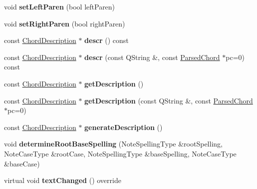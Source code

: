\begin{DoxyCompactItemize}
void {\bfseries set\+Left\+Paren} (bool left\+Paren)
\item 
\mbox{\label{class_ms_1_1_harmony_af1aa4c009b87d06fde12a7e87005ee74}} 
void {\bfseries set\+Right\+Paren} (bool right\+Paren)
\item 
\mbox{\label{class_ms_1_1_harmony_a32884bec863d0d850238f8090c31d319}} 
const \hyperlink{struct_ms_1_1_chord_description}{Chord\+Description} $\ast$ {\bfseries descr} () const
\item 
\mbox{\label{class_ms_1_1_harmony_a33f47123a38937ec90bcc843646b9ff4}} 
const \hyperlink{struct_ms_1_1_chord_description}{Chord\+Description} $\ast$ {\bfseries descr} (const Q\+String \&, const \hyperlink{class_ms_1_1_parsed_chord}{Parsed\+Chord} $\ast$pc=0) const
\item 
\mbox{\label{class_ms_1_1_harmony_a62c58cbb564560f73770416cb9592d55}} 
const \hyperlink{struct_ms_1_1_chord_description}{Chord\+Description} $\ast$ {\bfseries get\+Description} ()
\item 
\mbox{\label{class_ms_1_1_harmony_a3b107c6f71691adaae6b5b266526e168}} 
const \hyperlink{struct_ms_1_1_chord_description}{Chord\+Description} $\ast$ {\bfseries get\+Description} (const Q\+String \&, const \hyperlink{class_ms_1_1_parsed_chord}{Parsed\+Chord} $\ast$pc=0)
\item 
\mbox{\label{class_ms_1_1_harmony_a2bdb2f2d2a5bb5cfc4d8d3d76aed43c0}} 
const \hyperlink{struct_ms_1_1_chord_description}{Chord\+Description} $\ast$ {\bfseries generate\+Description} ()
\item 
\mbox{\label{class_ms_1_1_harmony_a37fd1f0bbde10931deea11cbce7d8a88}} 
void {\bfseries determine\+Root\+Base\+Spelling} (Note\+Spelling\+Type \&root\+Spelling, Note\+Case\+Type \&root\+Case, Note\+Spelling\+Type \&base\+Spelling, Note\+Case\+Type \&base\+Case)
\item 
\mbox{\label{class_ms_1_1_harmony_a656c2f1b322775f6f22ea11689799ae5}} 
virtual void {\bfseries text\+Changed} () override
\item 

\end{DoxyCompactItemize}
